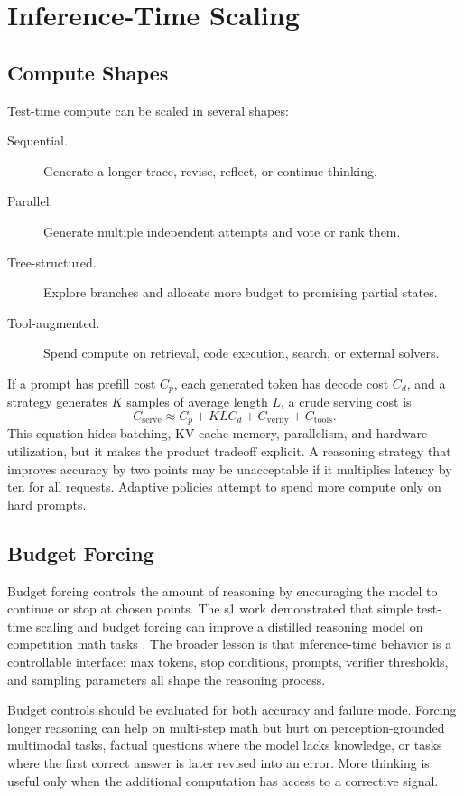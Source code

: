 \section{Inference-Time Scaling}
\subsection{Compute Shapes}
Test-time compute can be scaled in several shapes:
\begin{description}
    \item[Sequential.] Generate a longer trace, revise, reflect, or continue thinking.
    \item[Parallel.] Generate multiple independent attempts and vote or rank them.
    \item[Tree-structured.] Explore branches and allocate more budget to promising partial states.
    \item[Tool-augmented.] Spend compute on retrieval, code execution, search, or external solvers.
\end{description}
If a prompt has prefill cost $C_p$, each generated token has decode cost $C_d$, and a strategy generates $K$ samples of average length $L$, a crude serving cost is
\[
    C_{\mathrm{serve}}
    \approx
    C_p + K L C_d + C_{\mathrm{verify}} + C_{\mathrm{tools}}.
\]
This equation hides batching, KV-cache memory, parallelism, and hardware utilization, but it makes the product tradeoff explicit. A reasoning strategy that improves accuracy by two points may be unacceptable if it multiplies latency by ten for all requests. Adaptive policies attempt to spend more compute only on hard prompts.

\subsection{Budget Forcing}
Budget forcing controls the amount of reasoning by encouraging the model to continue or stop at chosen points. The s1 work demonstrated that simple test-time scaling and budget forcing can improve a distilled reasoning model on competition math tasks \cite{muennighoff2025s1}. The broader lesson is that inference-time behavior is a controllable interface: max tokens, stop conditions, prompts, verifier thresholds, and sampling parameters all shape the reasoning process.

Budget controls should be evaluated for both accuracy and failure mode. Forcing longer reasoning can help on multi-step math but hurt on perception-grounded multimodal tasks, factual questions where the model lacks knowledge, or tasks where the first correct answer is later revised into an error. More thinking is useful only when the additional computation has access to a corrective signal.

